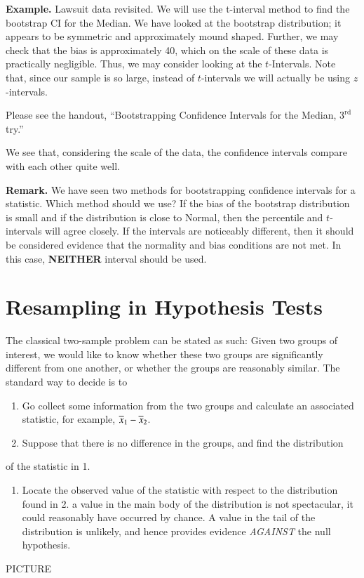 \documentclass[captions=tableheading]{scrbook}
\begin{document}
\textbf{Example.} Lawsuit data revisited. We will use the t-interval method to find the bootstrap CI for the Median. We have looked at the bootstrap distribution; it appears to be symmetric and approximately mound shaped. Further, we may check that the bias is approximately 40, which on the scale of these data is practically negligible. Thus, we may consider looking at the $t$-Intervals. Note that, since our sample is so large, instead of $t$-intervals we will actually be using $z$-intervals.

 

Please see the handout, ``Bootstrapping Confidence Intervals for the Median, $3^{\mathrm{rd}}$ try.''

 

We see that, considering the scale of the data, the confidence intervals compare with each other quite well.

 
\textbf{Remark.} We have seen two methods for bootstrapping confidence intervals for a statistic. Which method should we use? If the bias of the bootstrap distribution is small and if the distribution is close to Normal, then the percentile and $t$-intervals will agree closely. If the intervals are noticeably different, then it should be considered evidence that the normality and bias conditions are not met. In this case, \textbf{NEITHER} interval should be used.
\section{Resampling in Hypothesis Tests}
\label{sec-4_4}


The classical two-sample problem can be stated as such: Given two groups of interest, we would like to know whether these two groups are significantly different from one another, or whether the groups are reasonably similar. The standard way to decide is to


\begin{enumerate}
\item Go collect some information from the two groups and calculate an associated statistic, for example, $\overline{x}_{1}-\overline{x}_{2}$.
\item Suppose that there is no difference in the groups, and find the distribution
\end{enumerate}
of the statistic in 1. 


\begin{enumerate}
\item Locate the observed value of the statistic with respect to the distribution found in 2. a value in the main body of the distribution is not spectacular, it could reasonably have occurred by chance. A value in the tail of the distribution is unlikely, and hence provides evidence \emph{AGAINST} the null hypothesis.
\end{enumerate}
PICTURE
\end{document}
